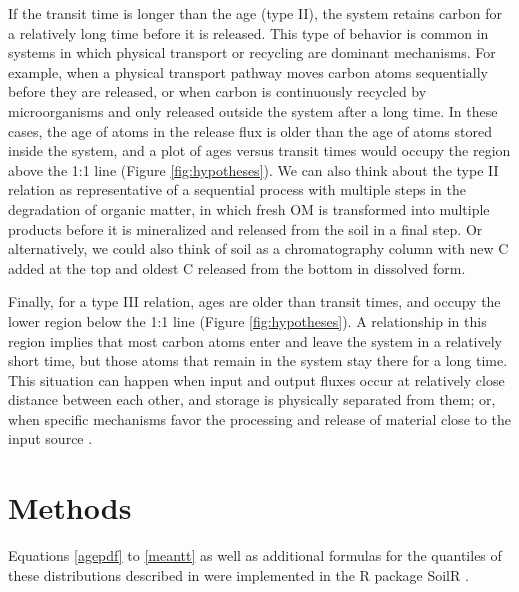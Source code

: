 \documentclass[draft,linenumbers]{agujournal}
\begin{document}
If the transit time is longer than the age (type II), the system retains carbon for a relatively long time before it is released. This type of behavior is common in systems in which physical transport or recycling are dominant mechanisms. For example, when a physical transport pathway moves carbon atoms sequentially before they are released, or when carbon is continuously recycled by microorganisms and only released outside the system after a long time. In these cases, the age of atoms in the release flux is older than the age of atoms stored inside the system, and a plot of ages versus transit times would occupy the region above the 1:1 line (Figure \ref{fig:hypotheses}).
We can also think about the type II relation as representative of a sequential process with multiple steps in the degradation of organic matter, in which fresh OM is transformed into multiple products before it is mineralized and released from the soil in a final step. Or alternatively, we could also think of soil as a chromatography column with new C added at the top and oldest C released from the bottom in dissolved form. 

Finally, for a type III relation, ages are older than transit times, and occupy the lower region below the 1:1 line (Figure \ref{fig:hypotheses}). A relationship in this region implies that most carbon atoms enter and leave the system in a relatively short time, but those atoms that remain in the system stay there for a long time. This situation can happen when input and output fluxes occur at relatively close distance between each other, and storage is physically separated from them; or, when specific mechanisms favor the processing and release of material close to the input source \citep{Bolin1973}. 


\section{Methods}
Equations \ref{agepdf} to \ref{meantt} as well as additional formulas for the quantiles of these distributions described in \citet{Metzler2018MG} were implemented in the R package SoilR \citep{Sierra2014GMD}.
\end{document}
